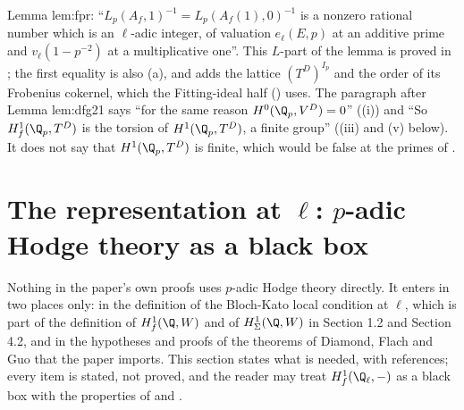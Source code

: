 \begin{paperlink}
Lemma lem:fpr: ``$L_p(A_f,1)^{-1}=L_p(A_f(1),0)^{-1}$ is a nonzero rational number which is an $\ell$-adic integer, of valuation $e_\ell(E,p)$ at an additive
prime and $v_\ell(1-p^{-2})$ at a multiplicative one''. This $L$-part of the lemma is proved in ; the first equality is also
(a), and  adds the lattice $(T^D)^{I_p}$ and the order of its Frobenius cokernel, which the
Fitting-ideal half () uses. The paragraph after Lemma lem:dfg21 says ``for the same reason
$H^0(\Q_p,V^D)=0$'' ((i)) and ``So $H^1_f(\Q_p,T^D)$ is the torsion of $H^1(\Q_p,T^D)$, a finite group''
((iii) and (v) below). It does not say that $H^1(\Q_p,T^D)$ is finite, which would be
false at the primes of .
\end{paperlink}

\section[The representation at \texorpdfstring{$\ell$}{l}]{The representation at \texorpdfstring{$\ell$}{l}: \texorpdfstring{$p$}{p}-adic Hodge theory as a black box}\label{sec:blochkato:hodge}

Nothing in the paper's own proofs uses $p$-adic Hodge theory directly. It enters in two places only: in the definition of the Bloch-Kato local
condition at $\ell$, which is part of the definition of $H^1_f(\Q,W)$ and of $H^1_\Sigma(\Q,W)$ in Section 1.2 and Section 4.2, and in the hypotheses
and proofs of the theorems of Diamond, Flach and Guo that the paper imports. This section states what is needed, with references; every item is
stated, not proved, and the reader may treat $H^1_f(\Q_\ell,-)$ as a black box with the properties of  and
.

